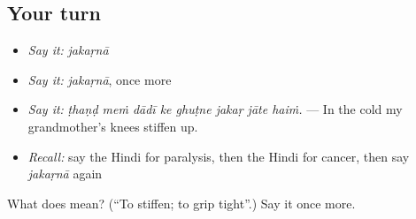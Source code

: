 \subsection*{Your turn}
\begin{itemize}
\raggedright
  \item \emph{Say it:} \emph{jakaṛnā}
  \item \emph{Say it:} \emph{jakaṛnā}, once more
  \item \emph{Say it:} \emph{ṭhaṇḍ meṁ dādī ke ghuṭne jakaṛ jāte haiṁ.} — In the cold my grandmother's knees stiffen up.
  \item \emph{Recall:} say the Hindi for paralysis, then the Hindi for cancer, then say \emph{jakaṛnā} again
\end{itemize}

\begin{tcolorbox}[breakable,colback=teal!4,colframe=teal!35!black,title={Before you move on}]
What does  mean? (\textquotedblleft{}To stiffen; to grip tight\textquotedblright{}.) Say it once more.
\end{tcolorbox}
